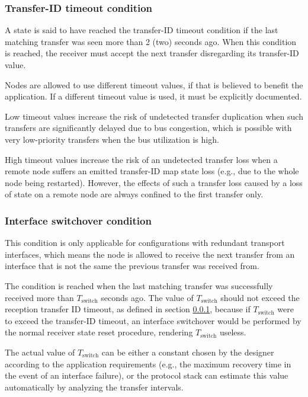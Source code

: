 \subsubsection{Transfer-ID timeout condition}\label{sec:transfer_id_timeout_condition}

A state is said to have reached the transfer-ID timeout condition
if the last matching transfer was seen more than 2 (two) seconds ago.
When this condition is reached, the receiver must accept the next transfer disregarding its transfer-ID value.

Nodes are allowed to use different timeout values, if that is believed to benefit the application.
If a different timeout value is used, it must be explicitly documented.

Low timeout values increase the risk of undetected transfer duplication when such transfers are significantly
delayed due to bus congestion, which is possible with very low-priority transfers when the bus utilization is high.

High timeout values increase the risk of an undetected transfer loss when a remote node suffers an emitted transfer-ID
map state loss (e.g., due to the whole node being restarted).
However, the effects of such a transfer loss caused by a loss of state on a remote node
are always confined to the first transfer only.

\subsubsection{Interface switchover condition}\label{sec:transfer_interface_switchover_condition}

This condition is only applicable for configurations with redundant transport interfaces, which means
the node is allowed to receive the next transfer from an interface that is not the same
the previous transfer was received from.

The condition is reached when the last matching transfer was successfully received more than
$T_\text{switch}$ seconds ago. The value of $T_\text{switch}$ should not exceed the reception transfer
ID timeout, as defined in section \ref{sec:transfer_id_timeout_condition},
because if $T_\text{switch}$ were to exceed the transfer-ID timeout, an interface switchover would be
performed by the normal receiver state reset procedure, rendering $T_\text{switch}$ useless.

The actual value of $T_\text{switch}$ can be either a constant chosen by the designer according
to the application requirements (e.g., the maximum recovery time in the event of an interface failure),
or the protocol stack can estimate this value automatically by analyzing the transfer intervals.


